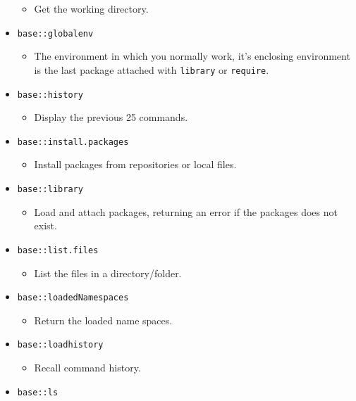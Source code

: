 \documentclass[
]{book}
\providecommand{\tightlist}{%
  \setlength{\itemsep}{0pt}\setlength{\parskip}{0pt}}
\begin{document}
\begin{itemize}
  \begin{itemize}
  \tightlist
  \item
    Get the working directory.
  \end{itemize}
\item
  \texttt{base::globalenv}

  \begin{itemize}
  \tightlist
  \item
    The environment in which you normally work, it's enclosing environment is the last package attached with \texttt{library} or \texttt{require}.
  \end{itemize}
\item
  \texttt{base::history}

  \begin{itemize}
  \tightlist
  \item
    Display the previous 25 commands.
  \end{itemize}
\item
  \texttt{base::install.packages}

  \begin{itemize}
  \tightlist
  \item
    Install packages from repositories or local files.
  \end{itemize}
\item
  \texttt{base::library}

  \begin{itemize}
  \tightlist
  \item
    Load and attach packages, returning an error if the packages does not exist.
  \end{itemize}
\item
  \texttt{base::list.files}

  \begin{itemize}
  \tightlist
  \item
    List the files in a directory/folder.
  \end{itemize}
\item
  \texttt{base::loadedNamespaces}

  \begin{itemize}
  \tightlist
  \item
    Return the loaded name spaces.
  \end{itemize}
\item
  \texttt{base::loadhistory}

  \begin{itemize}
  \tightlist
  \item
    Recall command history.
  \end{itemize}
\item
  \texttt{base::ls}


\end{itemize}
\end{document}
